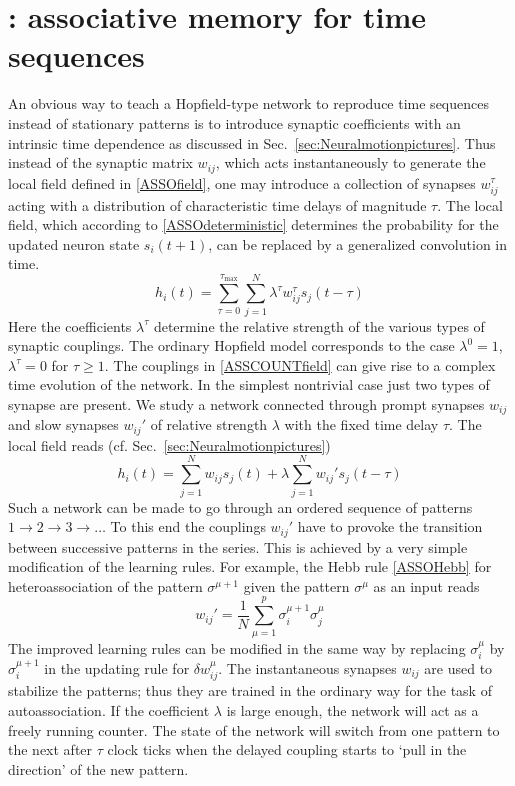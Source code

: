 \section[ASSCOUNT: associative memory for time sequences]{: associative memory for time sequences}\label{sec:ASSCOUNT}
An obvious way to teach a Hopfield-type network to reproduce time sequences instead of stationary patterns is to introduce synaptic coefficients with an intrinsic time dependence as discussed in Sec.~\ref{sec:Neuralmotionpictures}. Thus instead of the synaptic matrix $w_{ij}$, which acts instantaneously to generate the local field defined in \eqref{ASSOfield}, one may introduce a collection of synapses $w_{ij}^\tau$ acting with a distribution of characteristic time delays of magnitude $\tau$. The local field, which according to \eqref{ASSOdeterministic} determines the probability for the updated neuron state $s_i(t+1)$, can be replaced by a generalized convolution in time.
\begin{equation}\label{ASSCOUNTfield}
h_i(t)=\sum_{\tau=0}^{\tau_{\text{max}}}\sum_{j=1}^N\lambda^\tau w_{ij}^\tau s_j(t-\tau)
\end{equation}
Here the coefficients $\lambda^\tau$ determine the relative strength of the various types of synaptic couplings. The ordinary Hopfield model corresponds to the case $\lambda^0=1$, $\lambda^\tau=0$ for $\tau\geq1$. The couplings in \eqref{ASSCOUNTfield} can give rise to a complex time evolution of the network. In the simplest nontrivial case just two types of synapse are present. We study a network connected through prompt synapses $w_{ij}$ and slow synapses $w_{ij}'$ of relative strength $\lambda$ with the fixed time delay $\tau$. The local field reads (cf. Sec.~\ref{sec:Neuralmotionpictures})
\begin{equation}
h_i(t)=\sum_{j=1}^Nw_{ij}s_j(t)+\lambda\sum_{j=1}^Nw_{ij}'s_j(t-\tau)
\end{equation}
Such a network can be made to go through an ordered sequence of patterns $1\rightarrow2\rightarrow3\rightarrow\ldots$ To this end the couplings $w_{ij}'$ have to provoke the transition between successive patterns in the series. This is achieved by a very simple modification of the learning rules. For example, the Hebb rule \eqref{ASSOHebb} for heteroassociation of the pattern $\sigma^{\mu+1}$ given the pattern $\sigma^\mu$ as an input reads
\begin{equation}
w_{ij}'=\frac{1}{N}\sum_{\mu=1}^p\sigma_i^{\mu+1}\sigma_j^\mu
\end{equation}
The improved learning rules can be modified in the same way by replacing $\sigma_i^\mu$ by $\sigma_i^{\mu+1}$ in the updating rule for $\delta w_{ij}^\mu$. The instantaneous synapses $w_{ij}$ are used to stabilize the patterns; thus they are trained in the ordinary way for the task of autoassociation. If the coefficient $\lambda$ is large enough, the network will act as a freely running counter. The state of the network will switch from
one pattern to the next after $\tau$ clock ticks when the delayed coupling starts to `pull in the direction' of the new pattern.

